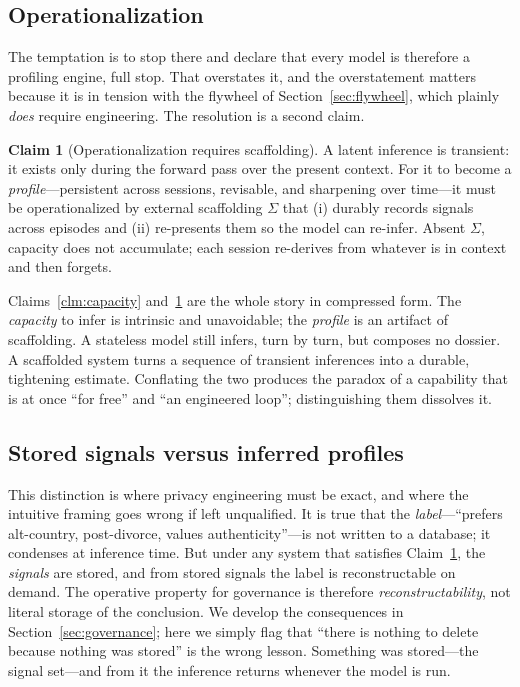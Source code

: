 \documentclass[conference]{IEEEtran}
\theoremstyle{definition}
\newtheorem{claim}{Claim}
\newcommand{\scaffold}{\Sigma}
\begin{document}
\subsection{Operationalization}
The temptation is to stop there and declare that every model is therefore a profiling engine, full stop. That overstates it, and the overstatement matters because it is in tension with the flywheel of Section~\ref{sec:flywheel}, which plainly \emph{does} require engineering. The resolution is a second claim.

\begin{claim}[Operationalization requires scaffolding]
\label{clm:operational}
A latent inference is transient: it exists only during the forward pass over the present context. For it to become a \emph{profile}---persistent across sessions, revisable, and sharpening over time---it must be operationalized by external scaffolding $\scaffold$ that (i) durably records signals across episodes and (ii) re-presents them so the model can re-infer. Absent $\scaffold$, capacity does not accumulate; each session re-derives from whatever is in context and then forgets.
\end{claim}

Claims~\ref{clm:capacity} and~\ref{clm:operational} are the whole story in compressed form. The \emph{capacity} to infer is intrinsic and unavoidable; the \emph{profile} is an artifact of scaffolding. A stateless model still infers, turn by turn, but composes no dossier. A scaffolded system turns a sequence of transient inferences into a durable, tightening estimate. Conflating the two produces the paradox of a capability that is at once ``for free'' and ``an engineered loop''; distinguishing them dissolves it.

\subsection{Stored signals versus inferred profiles}
This distinction is where privacy engineering must be exact, and where the intuitive framing goes wrong if left unqualified. It is true that the \emph{label}---``prefers alt-country, post-divorce, values authenticity''---is not written to a database; it condenses at inference time. But under any system that satisfies Claim~\ref{clm:operational}, the \emph{signals} are stored, and from stored signals the label is reconstructable on demand. The operative property for governance is therefore \emph{reconstructability}, not literal storage of the conclusion. We develop the consequences in Section~\ref{sec:governance}; here we simply flag that ``there is nothing to delete because nothing was stored'' is the wrong lesson. Something was stored---the signal set---and from it the inference returns whenever the model is run.
\end{document}
